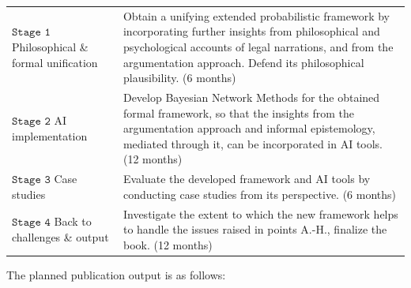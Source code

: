 \documentclass[11pt,dvipsnames,enabledeprecatedfontcommands]{scrartcl}
\begin{document}
\vspace{1mm}

\begin{center}
\begin{tabular}{p{2.3cm}|p{12.2cm}}
\footnotesize \textbf{$\mathtt{Stage  \,\, 1}$} \newline  \tiny Philosophical \&  formal \newline  unification & 
Obtain a unifying extended  probabilistic framework by incorporating further insights  from philosophical and psychological accounts of legal narrations, and from the argumentation approach. Defend its philosophical plausibility. \scriptsize (6 months)
\\
\footnotesize \textbf{$\mathtt{Stage \,\, 2}$} \newline  \tiny AI implementation 
 & Develop Bayesian Network Methods for the obtained formal framework, so that the insights from the argumentation approach and informal epistemology, mediated through it, can be incorporated in AI tools. \scriptsize (12 months)
\\
\footnotesize \textbf{$\mathtt{Stage  \,\, 3}$} \newline  \tiny    Case studies & 
Evaluate the developed framework and AI tools  by conducting case studies from its perspective.    \scriptsize (6 months) 
\\
\footnotesize \textbf{$\mathtt{Stage  \,\, 4}$} \newline  \tiny    Back to challenges \& output & 
Investigate the extent to which the new framework helps to handle the issues raised in points A.-H., finalize the book. \scriptsize (12 months)
\end{tabular}
\end{center}

\vspace{2mm}

The planned publication output is as follows:
\end{document}
